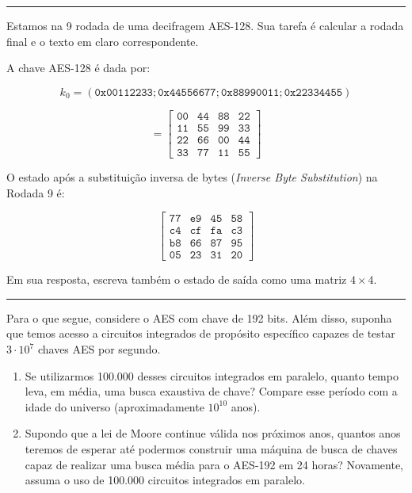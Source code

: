 \documentclass[12pt,a4paper]{article}
\newcommand{\exercicio}[1]{%
    \par\vspace{1.2em}
    \noindent
    {\color{black!55}\rule[-0.25em]{3pt}{1.6em}}%
    \hspace{0.6em}{\Large\bfseries Exerc\'{i}cio #1}
    \par\vspace{-0.4em}
    \noindent{\color{black!35}\rule{\textwidth}{0.4pt}}
    \par\vspace{0.35em}
}
\begin{document}
\exercicio{8}
Estamos na 9\textordmasculine{} rodada de uma decifragem AES-128. Sua tarefa \'{e} calcular a rodada final e o texto em claro correspondente.

A chave AES-128 \'{e} dada por:

\[
k_0 = (\texttt{0x00112233};\texttt{0x44556677};\texttt{0x88990011};\texttt{0x22334455})
\]

\[
=
\begin{bmatrix}
\texttt{00} & \texttt{44} & \texttt{88} & \texttt{22} \\
\texttt{11} & \texttt{55} & \texttt{99} & \texttt{33} \\
\texttt{22} & \texttt{66} & \texttt{00} & \texttt{44} \\
\texttt{33} & \texttt{77} & \texttt{11} & \texttt{55}
\end{bmatrix}
\]

O estado ap\'{o}s a substitui\c{c}\~{a}o inversa de bytes (\textit{Inverse Byte Substitution}) na Rodada 9 \'{e}:

\[
\begin{bmatrix}
\texttt{77} & \texttt{e9} & \texttt{45} & \texttt{58} \\
\texttt{c4} & \texttt{cf} & \texttt{fa} & \texttt{c3} \\
\texttt{b8} & \texttt{66} & \texttt{87} & \texttt{95} \\
\texttt{05} & \texttt{23} & \texttt{31} & \texttt{20}
\end{bmatrix}
\]

Em sua resposta, escreva tamb\'{e}m o estado de sa\'{i}da como uma matriz $4 \times 4$.

\newpage

\exercicio{9}
Para o que segue, considere o AES com chave de 192 bits. Al\'{e}m disso, suponha que temos acesso a circuitos integrados de prop\'{o}sito espec\'{i}fico capazes de testar $3 \cdot 10^7$ chaves AES por segundo.

\begin{enumerate}[label=\arabic*.]
    \item Se utilizarmos 100.000 desses circuitos integrados em paralelo, quanto tempo leva, em m\'{e}dia, uma busca exaustiva de chave? Compare esse per\'{i}odo com a idade do universo (aproximadamente $10^{10}$ anos).
    \item Supondo que a lei de Moore continue v\'{a}lida nos pr\'{o}ximos anos, quantos anos teremos de esperar at\'{e} podermos construir uma m\'{a}quina de busca de chaves capaz de realizar uma busca m\'{e}dia para o AES-192 em 24 horas? Novamente, assuma o uso de 100.000 circuitos integrados em paralelo.
\end{enumerate}
\end{document}
